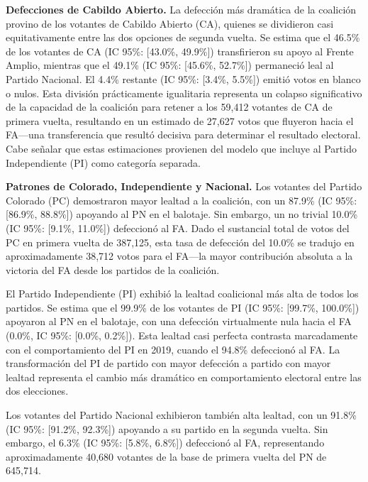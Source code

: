 

\textbf{Defecciones de Cabildo Abierto.} La defección más dramática de la coalición provino de los votantes de Cabildo Abierto (CA), quienes se dividieron casi equitativamente entre las dos opciones de segunda vuelta. Se estima que el 46.5\% de los votantes de CA (IC 95\%: [43.0\%, 49.9\%]) transfirieron su apoyo al Frente Amplio, mientras que el 49.1\% (IC 95\%: [45.6\%, 52.7\%]) permaneció leal al Partido Nacional. El 4.4\% restante (IC 95\%: [3.4\%, 5.5\%]) emitió votos en blanco o nulos. Esta división prácticamente igualitaria representa un colapso significativo de la capacidad de la coalición para retener a los 59,412 votantes de CA de primera vuelta, resultando en un estimado de 27,627 votos que fluyeron hacia el FA---una transferencia que resultó decisiva para determinar el resultado electoral. Cabe señalar que estas estimaciones provienen del modelo que incluye al Partido Independiente (PI) como categoría separada.

\textbf{Patrones de Colorado, Independiente y Nacional.} Los votantes del Partido Colorado (PC) demostraron mayor lealtad a la coalición, con un 87.9\% (IC 95\%: [86.9\%, 88.8\%]) apoyando al PN en el balotaje. Sin embargo, un no trivial 10.0\% (IC 95\%: [9.1\%, 11.0\%]) defeccionó al FA. Dado el sustancial total de votos del PC en primera vuelta de 387,125, esta tasa de defección del 10.0\% se tradujo en aproximadamente 38,712 votos para el FA---la mayor contribución absoluta a la victoria del FA desde los partidos de la coalición.

El Partido Independiente (PI) exhibió la lealtad coalicional más alta de todos los partidos. Se estima que el 99.9\% de los votantes de PI (IC 95\%: [99.7\%, 100.0\%]) apoyaron al PN en el balotaje, con una defección virtualmente nula hacia el FA (0.0\%, IC 95\%: [0.0\%, 0.2\%]). Esta lealtad casi perfecta contrasta marcadamente con el comportamiento del PI en 2019, cuando el 94.8\% defeccionó al FA. La transformación del PI de partido con mayor defección a partido con mayor lealtad representa el cambio más dramático en comportamiento electoral entre las dos elecciones.

Los votantes del Partido Nacional exhibieron también alta lealtad, con un 91.8\% (IC 95\%: [91.2\%, 92.3\%]) apoyando a su partido en la segunda vuelta. Sin embargo, el 6.3\% (IC 95\%: [5.8\%, 6.8\%]) defeccionó al FA, representando aproximadamente 40,680 votantes de la base de primera vuelta del PN de 645,714.

